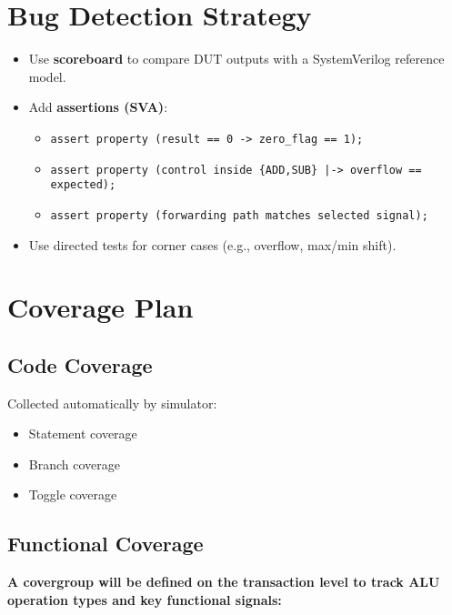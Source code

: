 \documentclass[a4paper,12pt]{article}
\begin{document}
\section{Bug Detection Strategy}

\begin{itemize}
    \item Use \textbf{scoreboard} to compare DUT outputs with a SystemVerilog reference model.
    \item Add \textbf{assertions (SVA)}:
    \begin{itemize}
        \item \texttt{assert property (result == 0 -> zero\_flag == 1);}
        \item \texttt{assert property (control inside \{ADD,SUB\} |-> overflow == expected);}
        \item \texttt{assert property (forwarding path matches selected signal);}
    \end{itemize}
    \item Use directed tests for corner cases (e.g., overflow, max/min shift).
\end{itemize}

\section{Coverage Plan}

\subsection{Code Coverage}
Collected automatically by simulator:
\begin{itemize}
    \item Statement coverage
    \item Branch coverage
    \item Toggle coverage
\end{itemize}

\subsection{Functional Coverage}

\textbf{A covergroup will be defined on the transaction level to track ALU operation types and key functional signals:}
\end{document}
